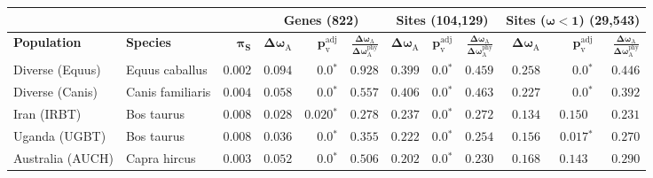\documentclass{article}
\begin{document}
    \begin{table*}[!ht]
        \centering
        \begin{adjustbox}{width = 1\textwidth}
            \begin{tabular}{||l|l|r||r|r|r||r|r|r||r|r|r||}
                \toprule
                \multicolumn{3}{||c||}{} &
                \multicolumn{3}{c||}{\textbf{Genes (822)}} &
                \multicolumn{3}{c||}{\textbf{Sites (104,129)}} &
                \multicolumn{3}{c||}{\textbf{Sites ($\bm{\omega < 1}$) (29,543)}}
                \\ \hline
                \textbf{Population} &
                \textbf{Species} &
                $\bm{\pi_{\textrm{S}}}$ &
                $\bm{\Delta \omega_{\mathrm{A}}}$ &
                $\bm{p_{\mathrm{v}}^{\mathrm{adj}}}$    &
                $\bm{\frac{\Delta\omega_{\mathrm{A}}}{\Delta\omega_{\mathrm{A}}^{\mathrm{phy}}}}$ &
                $\bm{\Delta \omega_{\mathrm{A}}}$ &
                $\bm{p_{\mathrm{v}}^{\mathrm{adj}}}$          &
                $\bm{\frac{\Delta\omega_{\mathrm{A}}}{\Delta\omega_{\mathrm{A}}^{\mathrm{phy}}}}$ &
                $\bm{\Delta \omega_{\mathrm{A}}}$ &
                $\bm{p_{\mathrm{v}}^{\mathrm{adj}}}$ &
                $\bm{\frac{\Delta\omega_{\mathrm{A}}}{\Delta\omega_{\mathrm{A}}^{\mathrm{phy}}}}$
                \\                \midrule
                Diverse (Equus)                                     & Equus caballus      & $ 0.002$ & $ 0.094$ & $\bm{0.0{^*}}$    & $ 0.928$ & $ 0.399$ & $\bm{0.0{^*}}$ & $ 0.459$ & $ 0.258$ & $\bm{0.0{^*}}$ & $ 0.446$ \\
                \rowcolor{LIGHTGREY} Diverse (Canis)                & Canis familiaris    & $ 0.004$ & $ 0.058$ & $\bm{0.0{^*}}$                  & $ 0.557$                                                                     & $ 0.406$ & $\bm{0.0{^*}}$ & $ 0.463$ & $ 0.227$ & $\bm{0.0{^*}}$ & $ 0.392$ \\
                Iran (IRBT)                                         & Bos taurus          & $ 0.008$ & $ 0.028$ & $\bm{ 0.020{^*}}$ & $ 0.278$ & $ 0.237$ & $\bm{0.0{^*}}$ & $ 0.272$ & $ 0.134$ & $ 0.150~~$ & $ 0.231$ \\
                Uganda (UGBT)                                       & Bos taurus          & $ 0.008$ & $ 0.036$ & $\bm{0.0{^*}}$    & $ 0.355$ & $ 0.222$ & $\bm{0.0{^*}}$ & $ 0.254$ & $ 0.156$ & $\bm{ 0.017{^*}}$ & $ 0.270$ \\
                \rowcolor{LIGHTGREY} Australia (AUCH)               & Capra hircus        & $ 0.003$ & $ 0.052$ & $\bm{0.0{^*}}$                  & $ 0.506$                                                                     & $ 0.202$ & $\bm{0.0{^*}}$ & $ 0.230$ & $ 0.168$ & $ 0.143~~$ & $ 0.290$ \\

\end{tabular}
\end{adjustbox}
\end{table*}
\end{document}
